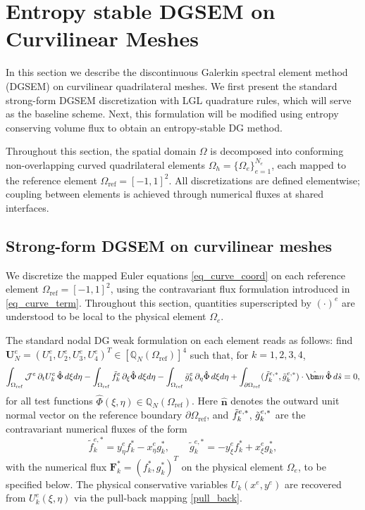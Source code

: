 \documentclass[fleqn,11pt]{amsart}
\newcommand{\omgr}{\Omega_{\mathrm{ref}}}
\newcommand{\QN}{\mathbb Q_N(\omgr)}
\begin{document}
\section{Entropy stable DGSEM on Curvilinear Meshes}
\label{sec:dgsem_curve}
In this section we describe the discontinuous Galerkin spectral element method (DGSEM) on curvilinear quadrilateral meshes. We first present the standard strong-form DGSEM discretization with LGL quadrature rules, which will serve as the baseline scheme. Next, this formulation will be modified using entropy conserving volume flux
to obtain an entropy-stable DG method.

Throughout this section, the spatial domain $\Omega$ is decomposed into conforming non-overlapping curved quadrilateral elements $\Omega_h= \{\Omega_e\}_{e=1}^{N_e}$, each mapped to the reference element $\Omega_{\mathrm{ref}}=[-1,1]^2$.
All discretizations are defined elementwise; coupling between elements is achieved through numerical fluxes
at shared interfaces.


\subsection{Strong-form DGSEM on curvilinear meshes}
\label{subsec:dgsem_plain}
We discretize the mapped Euler equations \eqref{eq_curve_coord} on each reference
element $\Omega_{\mathrm{ref}}=[-1,1]^2$, using the contravariant flux formulation
introduced in \eqref{eq_curve_term}. Throughout this section, quantities
superscripted by $(\cdot)^e$ are understood to be local to the physical element
$\Omega_e$.


The standard nodal DG weak formulation on each element reads as follows:
find $\bm U_N^e= (U_1^e,U_2^e, U_3^e, U_4^e)^T\in[\QN]^4$ such that, for $k=1,2,3,4$,
\begin{equation}
\int_{\Omega_{\mathrm{ref}}} \mathcal{J}^e\,\partial_tU_k^e\,\hat\Phi \,d\xi d\eta
-\int_{\Omega_{\mathrm{ref}}}\Tilde{f}_k^e\,\partial_{\xi}\hat\Phi \,d\xi d\eta
-\int_{\Omega_{\mathrm{ref}}}\Tilde{g}_k^e\,\partial_{\eta}\hat\Phi \,d\xi d\eta
+\int_{\partial\Omega_{\mathrm{ref}}}(\Tilde{f}_k^{e,*},\Tilde{g}_k^{e,*})\cdot \hat{\bm n}\,\hat\Phi \,d\hat s=0,\label{eq_weak_form}
\end{equation}
for all test functions $\hat \Phi(\xi,\eta)\in \mathbb{Q}_N(\Omega_{\mathrm{ref}})$.
Here $\hat{\bm n}$ denotes the outward unit normal vector on the reference boundary
$\partial\Omega_{\mathrm{ref}}$, and $\Tilde{f}_k^{e,*}$, $\Tilde{g}_k^{e,*}$ are the 
contravariant numerical fluxes of the form
\begin{equation}
\label{eq_contravariant_star}
\tilde{f}_k^{e,*} = y_{\eta}^e f_k^* - x_{\eta}^e g_k^*,
\qquad
\tilde{g}_k^{e,*} = -y_{\xi}^e f_k^* + x_{\xi}^e g_k^*,
\end{equation} 
with the numerical flux $\bm F_k^* = (f_k^*, g_k^*)^T$ on the physical element $\Omega_e$, to be specified below.
The physical conservative variables $U_k(x^e,y^e)$ are recovered from
$U_k^e(\xi,\eta)$ via the pull-back mapping \eqref{pull_back}.
\end{document}
